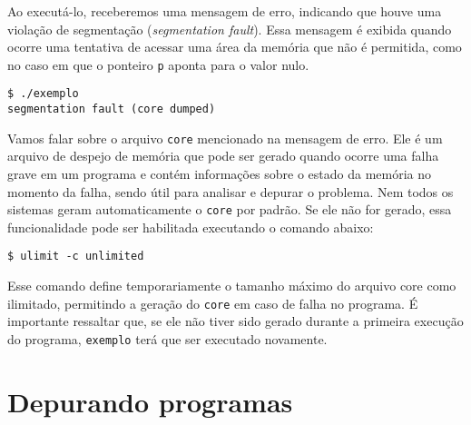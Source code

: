 Ao executá-lo, receberemos uma mensagem de erro, indicando que houve uma violação de segmentação (\textit{segmentation fault}). Essa mensagem é exibida quando ocorre uma tentativa de acessar uma área da memória que não é permitida, como no caso em que o ponteiro \texttt{p} aponta para o valor nulo.

\begin{scriptsize}
\estilobash
\begin{lstlisting}
$ ./exemplo
segmentation fault (core dumped)
\end{lstlisting}
\end{scriptsize}

Vamos falar sobre o arquivo \texttt{core} mencionado na mensagem de erro. Ele é um arquivo de despejo de memória que pode ser gerado quando ocorre uma falha grave em um programa e contém informações sobre o estado da memória no momento da falha, sendo útil para analisar e depurar o problema. Nem todos os sistemas geram automaticamente o \texttt{core} por padrão. Se ele não for gerado, essa funcionalidade pode ser habilitada executando o comando abaixo:

\begin{scriptsize}
\estilobash
\begin{lstlisting}
$ ulimit -c unlimited
\end{lstlisting}
\end{scriptsize}

Esse comando define temporariamente o tamanho máximo do arquivo core como ilimitado, permitindo a geração do \texttt{core} em caso de falha no programa. É importante ressaltar que, se ele não tiver sido gerado durante a primeira execução do programa, \texttt{exemplo} terá que ser executado novamente.


\section{Depurando programas}